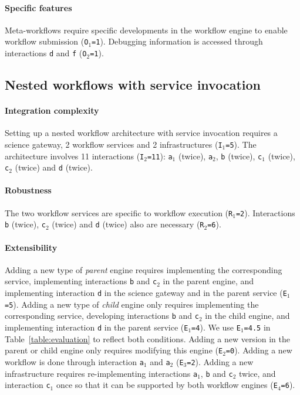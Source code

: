 \documentclass[preprint,3p,twocolumn]{elsarticle}
\begin{document}
\paragraph{Specific features} Meta-workflows require specific
developments in the workflow engine to enable workflow submission
(\texttt{O$_1$=1}). Debugging information is accessed through
interactions \texttt{d} and \texttt{f} (\texttt{O$_2$=1}).

\subsection{Nested workflows with service invocation}

\paragraph{Integration complexity} Setting up a nested workflow
architecture with service invocation requires a science gateway, 2
workflow services and 2 infrastructures (\texttt{I$_1$=5}). The
architecture involves 11 interactions (\texttt{I$_2$=11}):
\texttt{a$_1$} (twice), \texttt{a$_2$}, \texttt{b} (twice), \texttt{c$_1$} (twice),
\texttt{c$_2$} (twice) and
\texttt{d} (twice).

\paragraph{Robustness} The two workflow services are specific to
workflow execution (\texttt{R$_1$=2}). Interactions \texttt{b}
(twice), \texttt{c$_2$} (twice) and \texttt{d} (twice) also
are necessary (\texttt{R$_2$=6}).

\paragraph{Extensibility} Adding a new type of \emph{parent} engine
requires implementing the corresponding service,  implementing
interactions \texttt{b} and \texttt{c$_2$} in the parent engine, and
implementing interaction \texttt{d} in the science gateway and in the
parent service (\texttt{E$_1$=5}). Adding a new type of \emph{child}
engine only requires implementing the corresponding service, 
developing interactions \texttt{b} and \texttt{c$_2$} in the child
engine, and implementing interaction \texttt{d} in the parent service
(\texttt{E$_1$=4}). We use \texttt{E$_1$=4.5} in
Table~\ref{table:evaluation} to reflect both conditions. Adding a new
version in the parent or child engine only requires modifying this
engine (\texttt{E$_2$=0}). Adding a new workflow is done through
interaction \texttt{a$_1$} and \texttt{a$_2$}
(\texttt{E$_3$=2}). Adding a new infrastructure requires 
re-implementing interactions \texttt{a$_1$}, \texttt{b} and
\texttt{c$_2$} twice, and interaction \texttt{c$_1$} once so that it
can be supported by both workflow engines (\texttt{E$_4$=6}).
\end{document}
